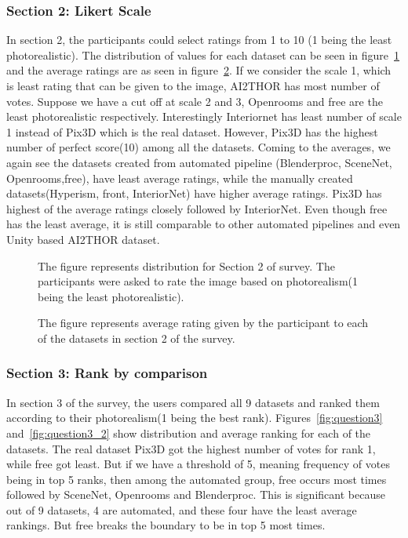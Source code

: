 \subsubsection{Section 2: Likert Scale}
In section 2, the participants could select ratings from 1 to 10 (1 being the least photorealistic).
The distribution of values for each dataset can be seen in figure~\ref{fig:question2} and the average ratings are as seen in figure~\ref{fig:question2_2}.
If we consider the scale 1, which is least rating that can be given to the image, AI2THOR has most number of votes.
Suppose we have a cut off at scale 2 and 3, Openrooms and \gls{free} are the least photorealistic respectively.
Interestingly Interiornet has least number of scale 1 instead of Pix3D which is the real dataset.
However, Pix3D has the highest number of perfect score(10) among all the datasets.
Coming to the averages, we again see the datasets created from automated pipeline (Blenderproc, SceneNet, Openrooms,\gls{free}), have least average ratings,
while the manually created datasets(Hyperism, \gls{front}, InteriorNet) have higher average ratings.
Pix3D has highest of the average ratings closely followed by InteriorNet.
Even though \gls{free} has the least average, it is still comparable to other automated pipelines and even Unity based AI2THOR dataset.

\begin{figure}
    \centering
    \resizebox{\textwidth}{!}{}
    \caption{The figure represents distribution for Section 2 of survey. The participants were asked to rate the image based on photorealism(1 being the least photorealistic).}
    \label{fig:question2}
\end{figure}

\begin{figure}
    \centering
    \resizebox{\textwidth}{!}{}
    \caption{The figure represents average rating given by the participant to each of the datasets in section 2 of the survey.}
    \label{fig:question2_2}
\end{figure}

\subsubsection{Section 3: Rank by comparison}
In section 3 of the survey, the users compared all 9 datasets and ranked them according to their photorealism(1 being the best rank).
Figures~\ref{fig:question3} and~\ref{fig:question3_2} show distribution and average ranking for each of the datasets.
The real dataset Pix3D got the highest number of votes for rank 1, while \gls{free} got least.
But if we have a threshold of 5, meaning frequency of votes being in top 5 ranks, then among the automated group, \gls{free} occurs most times followed by SceneNet, Openrooms and Blenderproc.
This is significant because out of 9 datasets, 4 are automated, and these four have the least average rankings.
But \gls{free} breaks the boundary to be in top 5 most times.

